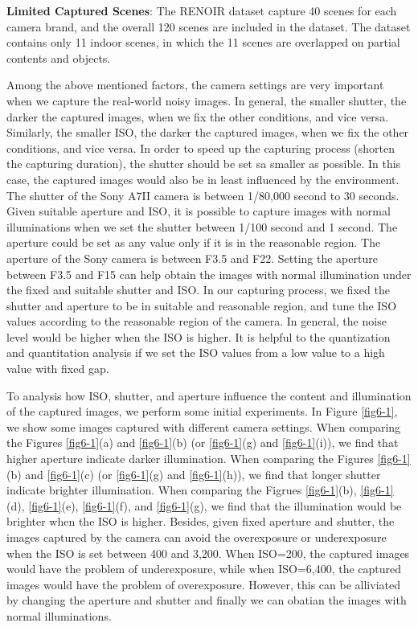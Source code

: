 \textbf{Limited Captured Scenes}: The RENOIR dataset \cite{RENOIR2014} capture 40 scenes for each camera brand, and the overall 120 scenes are included in the dataset.  The dataset \cite{crosschannel2016} contains only 11 indoor scenes, in which the 11 scenes are overlapped on partial contents and objects. 



Among the above mentioned factors, the camera settings are very important when we capture the real-world noisy images. In general, the smaller shutter, the darker the captured images, when we fix the other conditions, and vice versa. Similarly, the smaller ISO, the darker the captured images, when we fix the other conditions, and vice versa. In order to speed up the capturing process (shorten the capturing duration), the shutter should be set sa smaller as possible. In this case, the captured images would also be in least influenced by the environment. The shutter of the Sony A7II camera is between 1/80,000 second to 30 seconds. Given suitable aperture and ISO, it is possible to capture images with normal illuminations when we set the shutter between 1/100 second and 1 second. The aperture could be set as any value only if it is in the reasonable region. The aperture of the Sony camera is between F3.5 and F22. Setting the aperture between F3.5 and F15 can help obtain the images with normal illumination under the fixed and suitable shutter and ISO. In our capturing process, we fixed the shutter and aperture to be in suitable and reasonable region, and tune the ISO values according to the reasonable region of the camera. In general, the noise level would be higher when the ISO is higher. It is helpful to the quantization and quantitation analysis if we set the ISO values from a low value to a high value with fixed gap.

To analysis how ISO, shutter, and aperture influence the content and illumination of the captured images, we perform some initial experiments. In Figure \ref{fig6-1}, we show some images captured with different camera settings. When comparing the Figures \ref{fig6-1}(a) and \ref{fig6-1}(b) (or \ref{fig6-1}(g) and \ref{fig6-1}(i)), we find that higher aperture indicate darker illumination. When comparing the Figures \ref{fig6-1}(b) and \ref{fig6-1}(c) (or \ref{fig6-1}(g) and \ref{fig6-1}(h)), we find that longer shutter indicate brighter illumination. When comparing the Figrues \ref{fig6-1}(b), \ref{fig6-1}(d), \ref{fig6-1}(e), \ref{fig6-1}(f), and \ref{fig6-1}(g), we find that the illumination would be brighter when the ISO is higher. Besides, given fixed aperture and shutter, the images captured by the camera can avoid the overexposure or underexposure when the ISO is set between 400 and 3,200.  When ISO=200, the captured images would have the problem of underexposure, while when ISO=6,400, the captured images would have the problem of overexposure. However, this can be alliviated by changing the aperture and shutter and finally we can obatian the images with normal illuminations.

